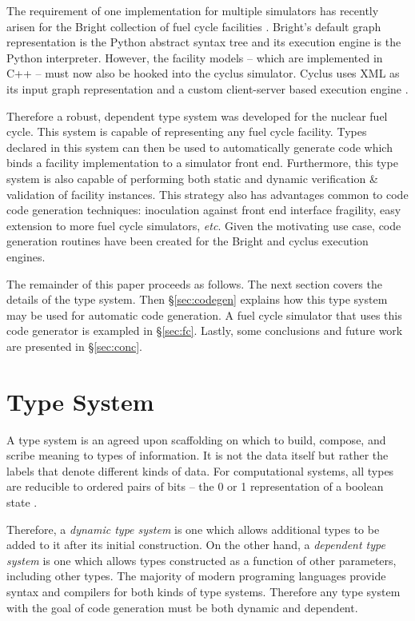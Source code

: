 \documentclass{ansconfpaper}
\begin{document}
The requirement of one implementation for multiple simulators has recently
arisen for the Bright collection of fuel cycle facilities \cite{Scopatz2009}.
Bright's default graph representation is the Python abstract syntax tree and its
execution engine is the Python interpreter.  However, the facility models -- 
which are implemented in C++ -- must now also be hooked into the cyclus simulator.  
Cyclus uses XML as its input graph representation and a custom client-server based 
execution engine \cite{cyclus2012}.

Therefore a robust, dependent type system was developed for the nuclear fuel cycle.
This system is capable of representing any fuel cycle facility.  Types declared in 
this system can then be used to automatically generate code which binds a facility 
implementation to a simulator front end.  
Furthermore, this type system is also capable of performing both static and dynamic
verification \& validation of facility instances.
This strategy also has advantages common to code code generation techniques:
inoculation against front end interface fragility, easy 
extension to more fuel cycle simulators, \emph{etc}.
Given the motivating use case, code 
generation routines have been created for the Bright and cyclus execution engines.

The remainder of this paper proceeds as follows.  The next section covers the 
details of the type system.  Then \S \ref{sec:codegen} explains how this type system
may be used for automatic code generation.  A fuel cycle simulator that uses this
code generator is exampled in \S \ref{sec:fc}.  Lastly, some conclusions and future
work are presented in \S \ref{sec:conc}.

\section{Type System}
\label{sec:ts}

A type system is an agreed upon scaffolding on which to build, compose, and scribe 
meaning to types of information.  It is not the data itself but rather the labels
that denote different kinds of data.  For computational systems, all types are 
reducible to ordered pairs of bits -- the 0 or 1 representation of a boolean state
\cite{DBLP:journals/jsyml/Church40}.

Therefore, a \emph{dynamic type system} is one which allows additional types to 
be added to it after its initial construction.  On the other hand, a \emph{dependent 
type system} is one which allows types constructed as a function of other parameters, 
including other types.  The majority of modern programing languages provide 
syntax and compilers for both kinds of type systems.  Therefore any type system with
the goal of code generation must be both dynamic and dependent.
\end{document}
